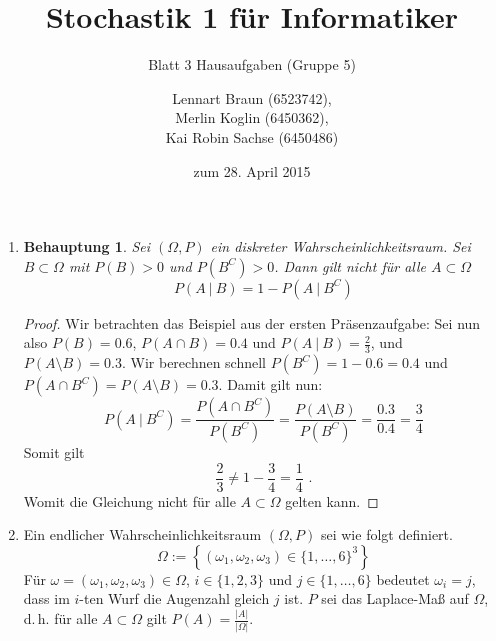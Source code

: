 \documentclass[a4paper]{scrartcl}
\title{Stochastik 1 für Informatiker}
\subtitle{Blatt 3 Hausaufgaben (Gruppe 5)}
\author{
    Lennart Braun (6523742), \\
    Merlin Koglin (6450362), \\
    Kai Robin Sachse (6450486)
}
\date{zum 28. April 2015}
\newtheorem*{behaupt}{Behauptung}
\begin{document}
\maketitle

\begin{enumerate}[label=\bfseries\arabic*.]
    \item
        \begin{behaupt}
            Sei $(\Omega, P)$ ein diskreter Wahrscheinlichkeitsraum.
            Sei $B \subset \Omega$ mit $P(B) > 0$ und $P(B^C) > 0$.
            Dann gilt nicht für alle $A \subset \Omega$
            \begin{equation*}
                P(A\ |\ B) = 1 - P(A\ |\ B^C)
            \end{equation*}
        \end{behaupt}
        \begin{proof}
            Wir betrachten das Beispiel aus der ersten Präsenzaufgabe:
            Sei nun also $P(B) = \num{0,6}$, $P(A \cap B) = \num{0,4}$ und
            $P(A\ |\ B) = \frac{2}{3}$, und $P(A \setminus B) = \num{0,3}$.
            Wir berechnen schnell $P(B^C) = 1 - \num{0,6} = \num{0,4}$ und
            $P(A \cap B^C) = P(A \setminus B) = \num{0,3}$.
            Damit gilt nun:
            \begin{equation*}
                P(A\ |\ B^C) = \frac{P(A \cap B^C)}{P(B^C)}
                = \frac{P(A \setminus B)}{P(B^C)} = \frac{\num{0,3}}{\num{0,4}}
                = \frac{3}{4}
            \end{equation*}
            Somit gilt 
            \begin{equation*}
                \frac{2}{3} \neq 1 - \frac{3}{4} = \frac{1}{4} \text{ .}
            \end{equation*}
            Womit die Gleichung nicht für alle $A \subset \Omega$ gelten kann. 
        \end{proof}

    \item
        Ein endlicher Wahrscheinlichkeitsraum $(\Omega, P)$ sei wie folgt
        definiert.
        \begin{equation*}
            \Omega := \left\{ (\omega_1, \omega_2, \omega_3)
                \in \{1, \ldots, 6\}^3 \right\}
        \end{equation*}
        Für $\omega = (\omega_1, \omega_2, \omega_3) \in \Omega$,
        $i \in \{1, 2, 3\}$ und $j \in \{1, \ldots, 6\}$ bedeutet
        $\omega_i = j$, dass im $i$-ten Wurf die Augenzahl gleich $j$ ist.
        $P$ sei das Laplace-Maß auf $\Omega$, d.\,h. für alle $A \subset \Omega$
        gilt $P(A) = \frac{|A|}{|\Omega|}$.


\end{enumerate}
\end{document}
